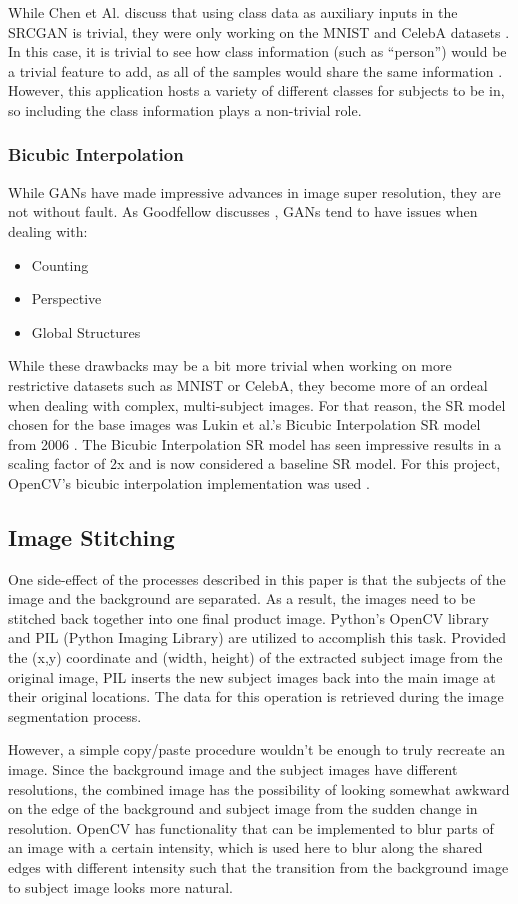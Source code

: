 While Chen et Al. discuss that using class data as auxiliary inputs in the
SRCGAN is trivial, they were only working on the MNIST and CelebA datasets
\cite{Chen}. In this case, it is trivial to see how class information (such as
“person”) would be a trivial feature to add, as all of the samples would share
the same information \cite{Chen}. However, this application hosts a variety of
different classes for subjects to be in, so including the class information
plays a non-trivial role. \\

\subsubsection{Bicubic Interpolation}
While GANs have made impressive advances in image super resolution, they are not
without fault. As Goodfellow discusses \cite{Goodfellow2017}, GANs tend to have
issues when dealing with:

\begin{itemize}
	\item Counting
	\item Perspective
	\item Global Structures
\end{itemize}

While these drawbacks may be a bit more trivial when working on more restrictive
datasets such as MNIST or CelebA, they become more of an ordeal when dealing
with complex, multi-subject images. For that reason, the SR model chosen for the
base images was Lukin et al.’s Bicubic Interpolation SR model from 2006
\cite{Lukin2006}. The Bicubic Interpolation SR model has seen impressive results in a scaling
factor of 2x and is now considered a baseline SR model. For this project,
OpenCV’s bicubic interpolation implementation was used \cite{Bradski2000}.

\subsection{Image Stitching}
One side-effect of the processes described in this paper is that the subjects of
the image and the background are separated. As a result, the images need to be
stitched back together into one final product image. Python’s OpenCV library and
PIL (Python Imaging Library) are utilized to accomplish this task. Provided the
(x,y) coordinate and (width, height) of the extracted subject image from the
original image, PIL inserts the new subject images back into the main image at
their original locations. The data for this operation is retrieved during the
image segmentation process.

However, a simple copy/paste procedure wouldn’t be enough to truly recreate an
image. Since the background image and the subject images have different
resolutions, the combined image has the possibility of looking somewhat awkward
on the edge of the background and subject image from the sudden change in
resolution. OpenCV has functionality that can be implemented to blur parts of an
image with a certain intensity, which is used here to blur along the shared
edges with different intensity such that the transition from the background
image to subject image looks more natural.
